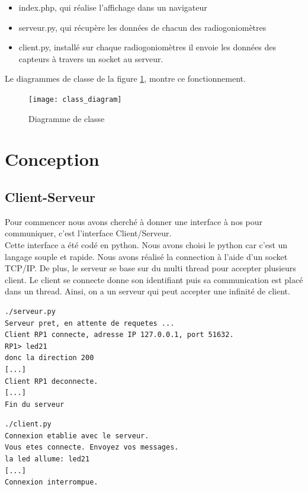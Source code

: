 \begin{itemize}
\item index.php, qui réalise l'affichage dans un navigateur
\item serveur.py, qui récupère les données de chacun des radiogoniomètres
\item client.py, installé sur chaque radiogoniomètres il envoie les données des capteurs à travers un socket au serveur.
\end{itemize}

Le diagrammes de classe de la figure \ref{fig:class}, montre ce fonctionnement.

\begin{figure}[!h]
  \centering
  \texttt{[image: class\_diagram]}
  \caption{Diagramme de classe}
  \label{fig:class}
\end{figure}



\section{Conception}

\subsection{Client-Serveur}

Pour commencer nous avons cherché à donner une interface à nos \rpi pour communiquer, c'est l'interface Client/Serveur.
~\\

Cette interface a été codé en python. Nous avons choisi le python car c'est un langage souple et rapide. Nous avons réalisé la connection à l'aide d'un socket TCP/IP. De plus, le serveur se base sur du multi thread pour accepter plusieurs client. Le client se connecte donne son identifiant puis sa communication est placé dans un thread. Ainsi, on a un serveur qui peut accepter une infinité de client.
~\\


\begin{minipage}[h]{0.45\linewidth}

\begin{lstlisting}
./serveur.py
Serveur pret, en attente de requetes ...
Client RP1 connecte, adresse IP 127.0.0.1, port 51632.
RP1> led21
donc la direction 200
[...]
Client RP1 deconnecte.
[...]
Fin du serveur
\end{lstlisting}  
\end{minipage}\hfill
\begin{minipage}[h]{0.45\linewidth}
  
\begin{lstlisting}
./client.py
Connexion etablie avec le serveur.
Vous etes connecte. Envoyez vos messages.
la led allume: led21
[...]
Connexion interrompue.
\end{lstlisting}

\end{minipage}





